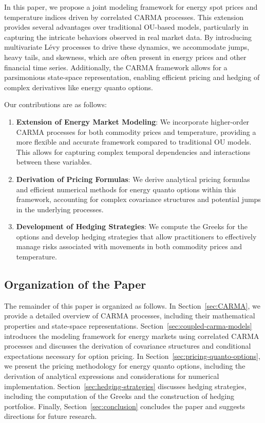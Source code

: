 \documentclass[10pt,a4paper,reqno]{amsart}
\theoremstyle{example}
\begin{document}
In this paper, we propose a joint modeling framework for energy spot prices and temperature indices driven by correlated CARMA processes. This extension provides several advantages over traditional OU-based models, particularly in capturing the intricate behaviors observed in real market data. By introducing multivariate Lévy processes to drive these dynamics, we accommodate jumps, heavy tails, and skewness, which are often present in energy prices and other financial time series. Additionally, the CARMA framework allows for a parsimonious state-space representation, enabling efficient pricing and hedging of complex derivatives like energy quanto options.

Our contributions are as follows:

\begin{enumerate}
    \item \textbf{Extension of Energy Market Modeling}: We incorporate higher-order CARMA processes for both commodity prices and temperature, providing a more flexible and accurate framework compared to traditional OU models. This allows for capturing complex temporal dependencies and interactions between these variables.

    \item \textbf{Derivation of Pricing Formulas}: We derive analytical pricing formulas and efficient numerical methods for energy quanto options within this framework, accounting for complex covariance structures and potential jumps in the underlying processes.

    \item \textbf{Development of Hedging Strategies}: We compute the Greeks for the options and develop hedging strategies that allow practitioners to effectively manage risks associated with movements in both commodity prices and temperature.
\end{enumerate}

\subsection{Organization of the Paper}

The remainder of this paper is organized as follows. In Section~\ref{sec:CARMA},
we provide a detailed overview of CARMA processes, including their mathematical
properties and state-space
representations. Section~\ref{sec:coupled-carma-models} introduces the modeling
framework for energy markets using correlated CARMA processes and discusses the
derivation of covariance structures and conditional expectations necessary for
option pricing. In Section~\ref{sec:pricing-quanto-options}, we present the
pricing methodology for energy quanto options, including the derivation of
analytical expressions and considerations for numerical
implementation. Section~\ref{sec:hedging-strategies} discusses hedging
strategies, including the computation of the Greeks and the construction of
hedging portfolios. Finally, Section~\ref{sec:conclusion} concludes the paper
and suggests directions for future research. 
\end{document}
